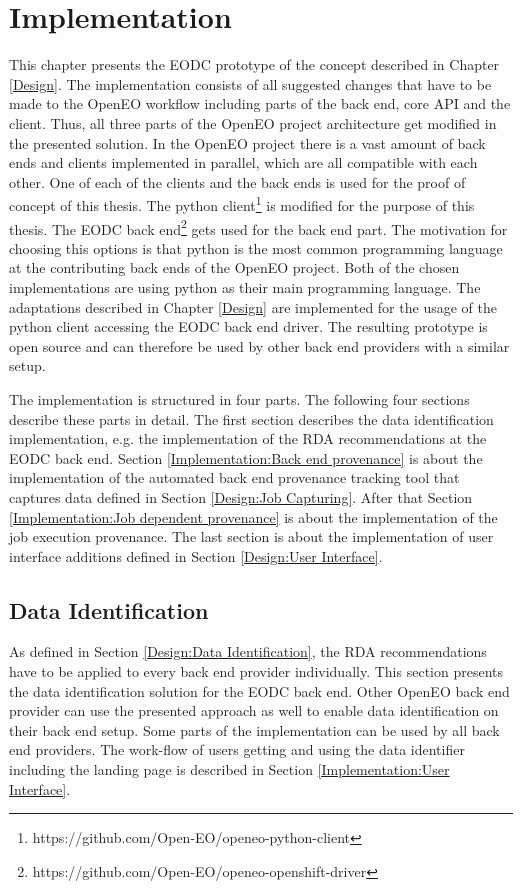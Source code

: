\documentclass[draft,final]{vutinfth} %
\begin{document}
\chapter{Implementation}\label{Implementation}
This chapter presents the EODC prototype of the concept described in Chapter \ref{Design}. The implementation consists of all suggested changes that have to be made to the OpenEO workflow including parts of the back end, core API and the client. Thus, all three parts of the OpenEO project architecture get modified in the presented solution. In the OpenEO project there is a vast amount of back ends and clients implemented in parallel, which are all compatible with each other. One of each of the clients and the back ends is used for the proof of concept of this thesis. The python client\footnote{https://github.com/Open-EO/openeo-python-client} is modified for the purpose of this thesis. The EODC back end\footnote{https://github.com/Open-EO/openeo-openshift-driver} gets used for the back end part. The motivation for choosing this options is that python is the most common programming language at the contributing back ends of the OpenEO project. Both of the chosen implementations are using python as their main programming language. The adaptations described in Chapter \ref{Design} are implemented for the usage of the python client accessing the EODC back end driver. The resulting prototype is open source and can therefore be used by other back end providers with a similar setup.  

The implementation is structured in four parts. The following four sections describe these parts in detail. The first section describes the data identification implementation, e.g. the implementation of the RDA recommendations at the EODC back end. Section \ref{Implementation:Back end provenance} is about the implementation of the automated back end provenance tracking tool that captures data defined in Section \ref{Design:Job Capturing}. After that Section \ref{Implementation:Job dependent provenance} is about the implementation of the job execution provenance. The last section is about the implementation of user interface additions defined in Section \ref{Design:User Interface}.     

\section{Data Identification}\label{Implementation:Data Identification}

As defined in Section \ref{Design:Data Identification}, the RDA recommendations have to be applied to every back end provider individually. This section presents the data identification solution for the EODC back end. Other OpenEO back end provider can use the presented approach as well to enable data identification on their back end setup. Some parts of the implementation can be used by all back end providers. The work-flow of users getting and using the data identifier including the landing page is described in Section \ref{Implementation:User Interface}. \\
\end{document}
